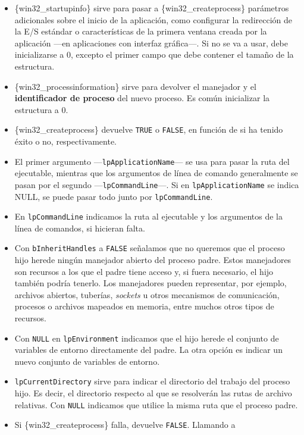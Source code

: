 \begin{itemize}
\item
  \{win32\_startupinfo\} sirve para pasar a \{win32\_createprocess\}
  parámetros adicionales sobre el inicio de la aplicación, como
  configurar la redirección de la E/S estándar o características de la
  primera ventana creada por la aplicación ---en aplicaciones con
  interfaz gráfica---. Si no se va a usar, debe inicializarse a 0,
  excepto el primer campo que debe contener el tamaño de la estructura.
\item
  \{win32\_processinformation\} sirve para devolver el manejador y el
  \textbf{identificador de proceso} del nuevo proceso. Es común
  inicializar la estructura a 0.
\item
  \{win32\_createprocess\} devuelve \texttt{TRUE} o \texttt{FALSE}, en
  función de si ha tenido éxito o no, respectivamente.
\item
  El primer argumento ---\texttt{lpApplicationName}--- se usa para pasar
  la ruta del ejecutable, mientras que los argumentos de línea de
  comando generalmente se pasan por el segundo
  ---\texttt{lpCommandLine}---. Si en \texttt{lpApplicationName} se
  indica NULL, se puede pasar todo junto por \texttt{lpCommandLine}.
\item
  En \texttt{lpCommandLine} indicamos la ruta al ejecutable y los
  argumentos de la línea de comandos, si hicieran falta.
\item
  Con \texttt{bInheritHandles} a \texttt{FALSE} señalamos que no
  queremos que el proceso hijo herede ningún manejador abierto del
  proceso padre. Estos manejadores son recursos a los que el padre tiene
  acceso y, si fuera necesario, el hijo también podría tenerlo. Los
  manejadores pueden representar, por ejemplo, archivos abiertos,
  tuberías, \emph{sockets} u otros mecanismos de comunicación, procesos
  o archivos mapeados en memoria, entre muchos otros tipos de recursos.
\item
  Con \texttt{NULL} en \texttt{lpEnvironment} indicamos que el hijo
  herede el conjunto de variables de entorno directamente del padre. La
  otra opción es indicar un nuevo conjunto de variables de entorno.
\item
  \texttt{lpCurrentDirectory} sirve para indicar el directorio del
  trabajo del proceso hijo. Es decir, el directorio respecto al que se
  resolverán las rutas de archivo relativas. Con \texttt{NULL} indicamos
  que utilice la misma ruta que el proceso padre.
\item
  Si \{win32\_createprocess\} falla, devuelve \texttt{FALSE}. Llamando a

\end{itemize}
